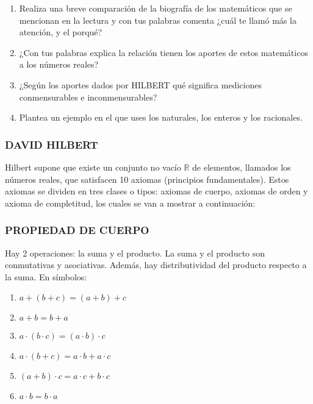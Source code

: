\documentclass[12pt,a4paper]{article}
\begin{document}
\begin{enumerate}
\item Realiza una breve comparación de la biografía de los matemáticos que se mencionan en la lectura y con tus palabras comenta ¿cuál te llamó más la atención, y el porqué?

\item ¿Con tus palabras explica la relación tienen los aportes de estos matemáticos a los números reales?

\item ¿Según los aportes dados por HILBERT qué significa mediciones conmensurables e inconmensurables?

\item Plantea un ejemplo en el que uses los naturales, los enteros y los racionales.
\end{enumerate}

\vspace{1cm}

\subsubsection*{DAVID HILBERT}

\begin{tcolorbox}[colback=fondoazul,colframe=azuloscuro,breakable]

Hilbert supone que existe un conjunto no vacío $\mathbb{R}$ de elementos, llamados los números reales, que satisfacen 10 axiomas (principios fundamentales). Estos axiomas se dividen en tres clases o tipos: axiomas de cuerpo, axiomas de orden y axioma de completitud, los cuales se van a mostrar a continuación:

\end{tcolorbox}

\vspace{0.5cm}

\subsubsection*{PROPIEDAD DE CUERPO}

Hay 2 operaciones: la suma y el producto. La suma y el producto son conmutativas y asociativas. Además, hay distributividad del producto respecto a la suma. En símbolos:

\begin{enumerate}
\item $a+(b+c) = (a+b)+c$
\item $a+b = b+a$
\item $a\cdot(b\cdot c) = (a\cdot b)\cdot c$
\item $a\cdot(b+c) = a\cdot b+a\cdot c$
\item $(a+b)\cdot c = a\cdot c+b\cdot c$
\item $a\cdot b =b\cdot a$
\end{enumerate}
\end{document}
